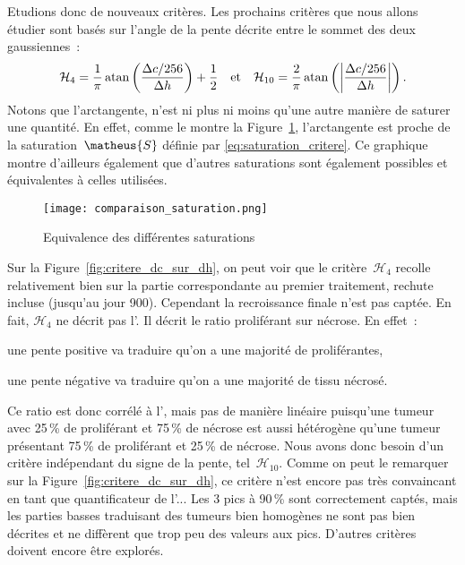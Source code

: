 \documentclass[main.tex]{subfiles}
\begin{document}
Etudions donc de nouveaux critères. 
Les prochains critères que nous allons étudier sont basés sur l'angle de la pente 
décrite entre le sommet des deux gaussiennes~:
\begin{equation}
\label{eq:critere_pente}
\mathcal{H}_4 = \dfrac{1}{\pi} \operatorname{atan} \left( \dfrac{ \Delta c / 256 }{ \Delta h }  \right) + \dfrac{1}{2}
\quad {\rm et } \quad
\mathcal{H}_{10} = \dfrac{2}{\pi} \operatorname{atan} \left( \left| \dfrac{ \Delta c / 256 }{ \Delta h } \right| \right).
\end{equation}
Notons que l'arctangente, n'est ni plus ni moins qu'une autre manière de saturer une quantité. En effet, comme le montre la Figure~\ref{fig:comp_saturation}, l'arctangente est proche de la saturation~$\matheus{S}$ définie par \eqref{eq:saturation_critere}. Ce graphique montre d'ailleurs également que d'autres saturations sont également possibles et équivalentes à celles utilisées.

\begin{figure}
\centering
\texttt{[image: comparaison\_saturation.png]}
\vspace{-3mm}
\caption{\label{fig:comp_saturation}Equivalence des différentes saturations}
\end{figure}

Sur la Figure~\ref{fig:critere_dc_sur_dh}, on peut voir que le critère~$\mathcal{H}_4$ recolle  relativement bien sur la partie correspondante au premier traitement, rechute incluse (jusqu'au jour 900). Cependant la recroissance finale n'est pas captée. En fait, $\mathcal{H}_4$ ne décrit pas l'\hetero. Il décrit le ratio proliférant sur nécrose. En effet~:
\begin{myitemize}
\item une pente positive va traduire qu'on a une majorité de proliférantes,
\item une pente négative va traduire qu'on a une majorité de tissu nécrosé.
\end{myitemize}
Ce ratio est donc corrélé à l'\hetero, mais pas de manière linéaire puisqu'une tumeur avec 25\,\% de proliférant et 75\,\% de nécrose est aussi hétérogène qu'une tumeur présentant 75\,\% de proliférant et 25\,\% de nécrose. Nous avons donc besoin d'un critère indépendant du signe de la pente, tel~$\mathcal{H}_{10}$. Comme on peut le remarquer sur la Figure~\ref{fig:critere_dc_sur_dh}, ce critère n'est encore pas très convaincant en tant que quantificateur de l'\hetero... Les 3 pics à 90\,\% sont correctement captés, mais les parties basses traduisant des tumeurs bien homogènes ne sont pas bien décrites et ne diffèrent que trop peu des valeurs aux pics. D'autres critères doivent encore être explorés.
\end{document}
